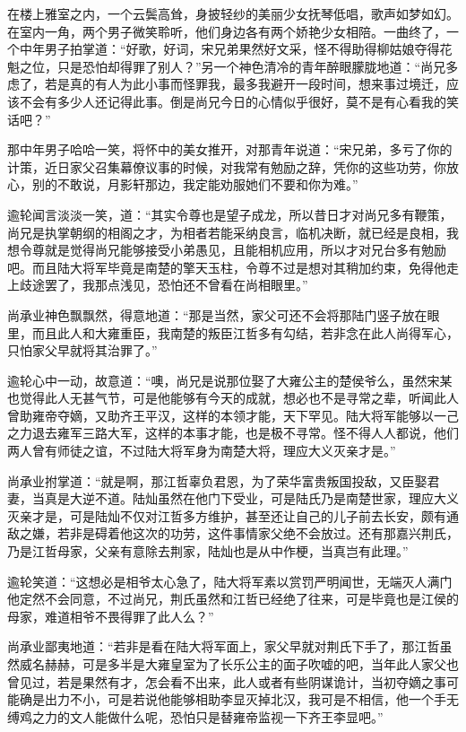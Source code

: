 在楼上雅室之内，一个云鬓高耸，身披轻纱的美丽少女抚琴低唱，歌声如梦如幻。在室内一角，两个男子微笑聆听，他们身边各有两个娇艳少女相陪。一曲终了，一个中年男子拍掌道：“好歌，好词，宋兄弟果然好文采，怪不得助得柳姑娘夺得花魁之位，只是恐怕却得罪了别人？”另一个神色清冷的青年醉眼朦胧地道：“尚兄多虑了，若是真的有人为此小事而怪罪我，最多我避开一段时间，想来事过境迁，应该不会有多少人还记得此事。倒是尚兄今日的心情似乎很好，莫不是有心看我的笑话吧？”

那中年男子哈哈一笑，将怀中的美女推开，对那青年说道：“宋兄弟，多亏了你的计策，近日家父召集幕僚议事的时候，对我常有勉励之辞，凭你的这些功劳，你放心，别的不敢说，月影轩那边，我定能劝服她们不要和你为难。”

逾轮闻言淡淡一笑，道：“其实令尊也是望子成龙，所以昔日才对尚兄多有鞭策，尚兄是执掌朝纲的相阁之才，为相者若能采纳良言，临机决断，就已经是良相，我想令尊就是觉得尚兄能够接受小弟愚见，且能相机应用，所以才对兄台多有勉励吧。而且陆大将军毕竟是南楚的擎天玉柱，令尊不过是想对其稍加约束，免得他走上歧途罢了，我那点浅见，恐怕还不曾看在尚相眼里。”

尚承业神色飘飘然，得意地道：“那是当然，家父可还不会将那陆门竖子放在眼里，而且此人和大雍重臣，我南楚的叛臣江哲多有勾结，若非念在此人尚得军心，只怕家父早就将其治罪了。”

逾轮心中一动，故意道：“噢，尚兄是说那位娶了大雍公主的楚侯爷么，虽然宋某也觉得此人无甚气节，可是他能够有今天的成就，想必也不是寻常之辈，听闻此人曾助雍帝夺嫡，又助齐王平汉，这样的本领才能，天下罕见。陆大将军能够以一己之力退去雍军三路大军，这样的本事才能，也是极不寻常。怪不得人人都说，他们两人曾有师徒之谊，不过陆大将军身为南楚大将，理应大义灭亲才是。”

尚承业拊掌道：“就是啊，那江哲辜负君恩，为了荣华富贵叛国投敌，又臣娶君妻，当真是大逆不道。陆灿虽然在他门下受业，可是陆氏乃是南楚世家，理应大义灭亲才是，可是陆灿不仅对江哲多方维护，甚至还让自己的儿子前去长安，颇有通敌之嫌，若非是碍着他这次的功劳，这件事情家父绝不会放过。还有那嘉兴荆氏，乃是江哲母家，父亲有意除去荆家，陆灿也是从中作梗，当真岂有此理。”

逾轮笑道：“这想必是相爷太心急了，陆大将军素以赏罚严明闻世，无端灭人满门他定然不会同意，不过尚兄，荆氏虽然和江哲已经绝了往来，可是毕竟也是江侯的母家，难道相爷不畏得罪了此人么？”

尚承业鄙夷地道：“若非是看在陆大将军面上，家父早就对荆氏下手了，那江哲虽然威名赫赫，可是多半是大雍皇室为了长乐公主的面子吹嘘的吧，当年此人家父也曾见过，若是果然有才，怎会看不出来，此人或者有些阴谋诡计，当初夺嫡之事可能确是出力不小，可是若说他能够相助李显灭掉北汉，我可是不相信，他一个手无缚鸡之力的文人能做什么呢，恐怕只是替雍帝监视一下齐王李显吧。”

